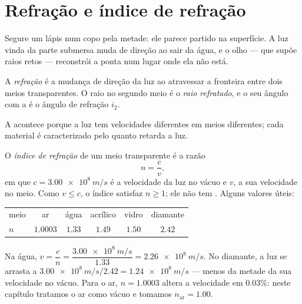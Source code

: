 \section{Refração e índice de refração}

Segure um lápis num copo pela metade: ele parece partido na superfície. A
luz vinda da parte submersa muda de direção ao sair da água, e o olho ---
que supõe raios retos --- reconstrói a ponta num lugar onde ela não está.

\begin{definition}[Refração]\label{def:g10:refraction:refraction}
A \emph{refração} é a mudança de direção da luz ao
atravessar a fronteira entre dois meios transparentes. O raio no segundo
meio é o \emph{raio refratado}, e o seu ângulo com
a  é o ângulo de refração $i_2$.
\end{definition}

A  acontece porque a luz tem velocidades diferentes em meios
diferentes; cada material é caracterizado pelo quanto retarda a luz.

\begin{definition}\label{def:g10:refraction:index}
O \emph{índice de refração} de um meio
transparente é a razão
\[
n = \frac{c}{v},
\]
em que $c = \qty{3.00e8}{m/s}$ é a velocidade da luz no vácuo e $v$, a
sua velocidade no meio. Como $v \leq c$, o índice satisfaz $n \geq 1$; ele
não tem . Alguns valores úteis:
\begin{center}
\begin{tabular}{lccccc}
meio & ar & água & acrílico & vidro & diamante \\
$n$ & $1.0003$ & $1.33$ & $1.49$ & $1.50$ & $2.42$ \\
\end{tabular}
\end{center}
\end{definition}

\begin{example}\label{ex:g10:refraction:speed}
Na água, $v = \dfrac{c}{n} = \dfrac{\qty{3.00e8}{m/s}}{1.33}
= \qty{2.26e8}{m/s}$. No diamante, a luz se arrasta a
$\qty{3.00e8}{m/s}/2.42 = \qty{1.24e8}{m/s}$ --- menos da metade da sua
velocidade no vácuo. Para o ar, $n = 1.0003$ altera a velocidade em
$0.03\%$: neste capítulo tratamos o ar como vácuo e tomamos
$n_{\text{ar}} = 1.00$.
\end{example}

